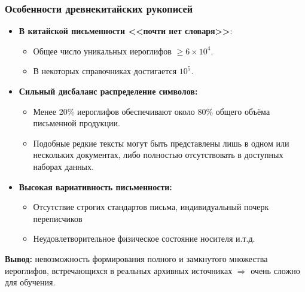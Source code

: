 \begin{frame}
    \frametitle{Особенности древнекитайских рукописей}

    \begin{itemize}
        \item \textbf{В китайской письменности <<почти нет словаря>>}:
              \begin{itemize}
                  \item Общее число уникальных иероглифов $\geqslant 6 \times 10^4$.
                  \item В некоторых справочниках достигается $10^5$.
              \end{itemize}
        \item \textbf{Сильный дисбаланс распределение символов:}
              \begin{itemize}
                  \item Менее 20\% иероглифов обеспечивают около 80\% общего объёма письменной продукции.
                  \item Подобные редкие тексты могут быть представлены лишь в одном или нескольких документах, либо полностью отсутствовать в доступных наборах данных.
              \end{itemize}
        \item \textbf{Высокая вариативность письменности:}
              \begin{itemize}
                  \item Отсутствие строгих стандартов письма, индивидуальный почерк переписчиков
                  \item Неудовлетворительное физическое состояние носителя и.т.д.
              \end{itemize}
    \end{itemize}

    \textbf{Вывод:} невозможность формирования полного и замкнутого множества иероглифов, встречающихся в реальных архивных источниках $\Rightarrow $ очень сложно для обучения.

\end{frame}

